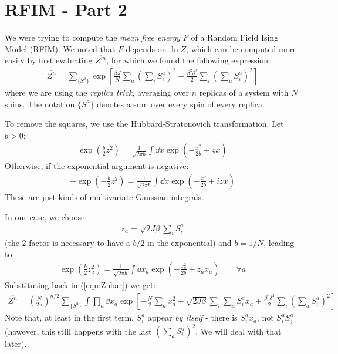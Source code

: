 \documentclass[../template.tex]{subfiles}
\begin{document}
\section{RFIM - Part 2}
We were trying to compute the \textit{mean free energy} $\bar{F}$ of a Random Field Ising Model (RFIM). We noted that $\bar{F}$ depends on $\overline{\ln Z}$, which can be computed more easily by first evaluating $\overline{Z^m}$, for which we found the following expression:
\begin{align}
    \overline{Z^n} = \sum_{\{S^a\}} \exp\left[\frac{\beta J}{N} \sum_a \left(\sum_i S_i^a\right)^2 + \frac{\beta^2 \delta^2}{2} \sum_i \left(\sum_a S_i^a\right)^2 \right]
    \label{eqn:Znbar}
\end{align}   
where we are using the \textit{replica trick}, averaging over $n$ replicas of a system with $N$ spins. The notation $\{S^a\}$ denotes a sum over every spin of every replica. 

To remove the squares, we use the Hubbard-Stratonovich transformation. Let $b > 0$: 
\begin{align*}
    \exp\left(\frac{b}{2} z^2 \right) = \frac{1}{\sqrt{2 \pi b}} \int \dd{x} \exp\left(-\frac{x^2}{2b} \pm zx \right) 
\end{align*}
Otherwise, if the exponential argument is negative:
\begin{align*}
    -\exp\left(-\frac{b}{2}z^2 \right) = \frac{1}{\sqrt{2 \pi b}} \int \dd{x} \exp\left(-\frac{x^2}{2b} \pm i z x\right) 
\end{align*} 
These are just kinds of multivariate Gaussian integrals.

\medskip
In our case, we choose:
\begin{align*}
    z_a = \sqrt{2 J \beta} \sum_i S_i^a
\end{align*}
(the $2$ factor is necessary to have a $b/2$ in the exponential) and $b = 1/N$, leading to:
\begin{align*}
    \exp\left(\frac{b}{2} z_a^2 \right) = \frac{1}{\sqrt{2 \pi b}} \int \dd{x_a} \exp\left(-\frac{x_a^2}{2b} + z_a x_a \right)  \qquad \forall a
\end{align*} 
Substituting back in (\ref{eqn:Znbar}) we get:
\begin{align*}
    \overline{Z^n} = \left(\frac{N}{2 \pi} \right)^{n/2} \sum_{\{S^a\}} \int \prod_a \dd{x_a} \exp\left[-\frac{N}{2} \sum_a x^2_a + \sqrt{2J \beta} \sum_i \sum_a S_i^a x_a + \frac{\beta^2 \delta^2}{2} \sum_i \left(\sum_a S_i^a \right)^2 \right]
\end{align*}
Note that, at least in the first term, $S_i^a$ appear \textit{by itself} - there is $S_i^a x_a$, not $S_i^a S_j^a$ (however, this still happens with the last $(\sum_a S_i^a)^2$. We will deal with that later).  
\end{document}
